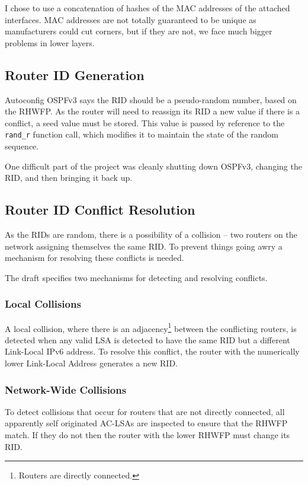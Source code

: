 I chose to use a concatenation of hashes of the MAC  addresses of the attached interfaces.
MAC addresses are not totally guaranteed to be unique as manufacturers could
cut corners, but if they are not, we face much bigger problems in lower layers.

\subsection{Router ID Generation}
Autoconfig OSPFv3 says the RID should be a pseudo-random number, based on
the RHWFP\@. As the router will need to reassign its RID a new value if
there is a conflict, a seed value must be stored. This value is passed by
reference to the \texttt{rand\_r} function call, which modifies it to maintain
the state of the random sequence.

One difficult part of the project was cleanly shutting down OSPFv3, changing
the RID, and then bringing it back up. 

\subsection{Router ID Conflict Resolution}
As the RIDs are random, there is a possibility of a collision -- two
routers on the network assigning themselves the same RID\@. To prevent
things going awry a mechanism for resolving these conflicts is needed. 

The draft specifies two mechanisms for detecting and resolving conflicts. 

\subsubsection{Local Collisions}
A local collision, where there is an adjacency\footnote{Routers are
directly connected.} between the conflicting routers, is detected when any
valid LSA is detected to have the same RID but a different Link-Local
IPv6 address. To resolve this conflict, the router with the numerically lower
Link-Local Address generates a new RID\@. 

\subsubsection{Network-Wide Collisions}
To detect collisions that occur for routers that are not directly connected,
all apparently self originated AC-LSAs are inspected to ensure that the RHWFP
match. If they do not then the router with the lower RHWFP must change its
RID.

